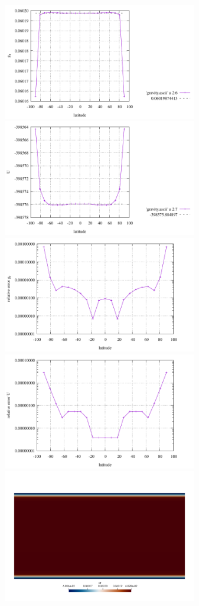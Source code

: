 \begin{center}
\includegraphics[width=8.5cm]{python_codes/fieldstone_98/images/benchconst/gr.pdf}
\includegraphics[width=8.5cm]{python_codes/fieldstone_98/images/benchconst/U.pdf}\\
\includegraphics[width=8.5cm]{python_codes/fieldstone_98/images/benchconst/gr_relerror}
\includegraphics[width=8.5cm]{python_codes/fieldstone_98/images/benchconst/U_relerror}\\
\includegraphics[width=8.5cm]{python_codes/fieldstone_98/images/benchconst/gr.png}

\end{center}
